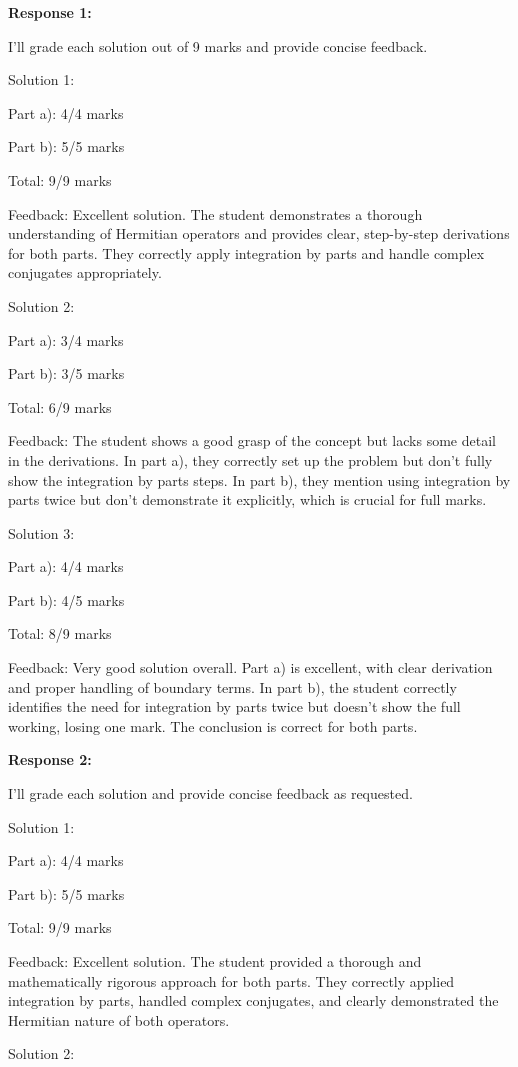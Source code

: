\documentclass[a4paper,11pt]{article}
\begin{document}
\textbf{Response 1:}

I'll grade each solution out of 9 marks and provide concise feedback.

Solution 1:

Part a): 4/4 marks

Part b): 5/5 marks

Total: 9/9 marks

Feedback: Excellent solution. The student demonstrates a thorough understanding of Hermitian operators and provides clear, step-by-step derivations for both parts. They correctly apply integration by parts and handle complex conjugates appropriately.

Solution 2:

Part a): 3/4 marks

Part b): 3/5 marks

Total: 6/9 marks

Feedback: The student shows a good grasp of the concept but lacks some detail in the derivations. In part a), they correctly set up the problem but don't fully show the integration by parts steps. In part b), they mention using integration by parts twice but don't demonstrate it explicitly, which is crucial for full marks.

Solution 3:

Part a): 4/4 marks

Part b): 4/5 marks

Total: 8/9 marks

Feedback: Very good solution overall. Part a) is excellent, with clear derivation and proper handling of boundary terms. In part b), the student correctly identifies the need for integration by parts twice but doesn't show the full working, losing one mark. The conclusion is correct for both parts.

\bigskip   
\textbf{Response 2:}

I'll grade each solution and provide concise feedback as requested.

Solution 1:

Part a): 4/4 marks

Part b): 5/5 marks

Total: 9/9 marks

Feedback: Excellent solution. The student provided a thorough and mathematically rigorous approach for both parts. They correctly applied integration by parts, handled complex conjugates, and clearly demonstrated the Hermitian nature of both operators.

Solution 2:
\end{document}
